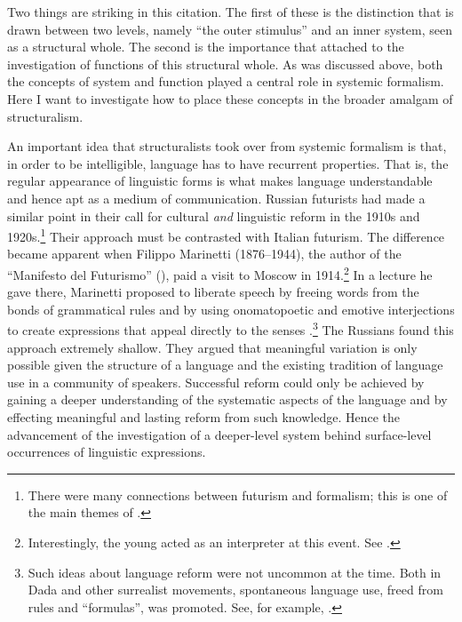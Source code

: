 \documentclass[output=paper]{langscibook}
\begin{document}
Two things are striking in this citation. The first of these is the distinction that is drawn between two levels, namely ``the outer stimulus'' and an inner system, seen as a structural whole. The second is the importance that {\Jakobson} attached to the investigation of functions of this structural whole. As was discussed above, both the concepts of system and function played a central role in systemic formalism. Here I want to investigate how to place these concepts in the broader amalgam of structuralism.

An important idea that structuralists took over from systemic formalism is that, in order to be intelligible, language has to have recurrent properties. That is, the regular appearance of linguistic forms is what makes language understandable and hence apt as a medium of communication. Russian futurists had made a similar point in their call for cultural \emph{and} linguistic reform in the 1910s and 1920s.\footnote{There were many connections between futurism and formalism; this is one of the main themes of \citet{Toman1995}.} Their approach must be contrasted with Italian futurism. The difference became apparent when Filippo Marinetti (1876--1944), the author of the ``Manifesto del Futurismo'' (\citeyear{Marinetti1909}), paid a visit to Moscow in 1914.\footnote{Interestingly, the young {\Jakobson} acted as an interpreter at this event. See \citet[17]{Toman1995}.} In a lecture he gave there, Marinetti proposed to liberate speech by freeing words from the bonds of grammatical rules and by using onomatopoetic and emotive interjections to create expressions that appeal directly to the senses \citep[87--88]{Gasparov2014}.\footnote{Such ideas about language reform were not uncommon at the time. Both in Dada and other surrealist movements, spontaneous language use, freed from rules and ``formulas'', was promoted. See, for example, \citet{Spaendonck1977}.} The Russians found this approach extremely shallow. They argued that meaningful variation is only possible given the structure of a language and the existing tradition of language use in a community of speakers. Successful reform could only be achieved by gaining a deeper understanding of the systematic aspects of the language and by effecting meaningful and lasting reform from such knowledge. Hence the advancement of the investigation of a deeper-level system behind surface-level occurrences of linguistic expressions. 
\end{document}

